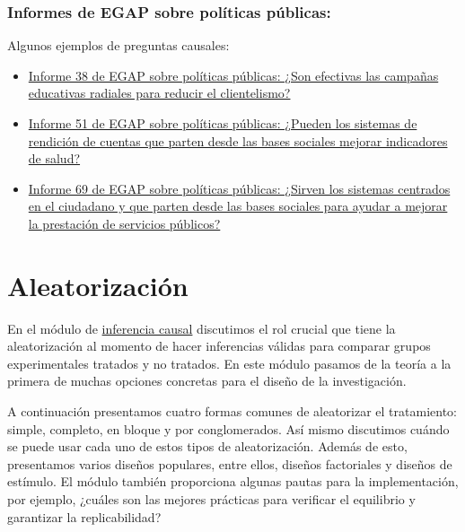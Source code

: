 \documentclass[
  12pt,
  spanish,
]{book}
\begin{document}
\hypertarget{informes-de-egap-sobre-poluxedticas-puxfablicas}{%
\subsection{Informes de EGAP sobre políticas públicas:}\label{informes-de-egap-sobre-poluxedticas-puxfablicas}}

Algunos ejemplos de preguntas causales:

\begin{itemize}
\item
  \href{https://egap.org/resource/brief-38-diminishing-the-effectiveness-of-vote-buying-through-voter-education/}{Informe 38 de EGAP sobre políticas públicas: ¿Son efectivas las campañas educativas radiales para reducir el clientelismo?}
\item
  \href{https://egap.org/resource/does-information-technology-improve-public-service-delivery-lessons-from-uganda/}{Informe 51 de EGAP sobre políticas públicas: ¿Pueden los sistemas de rendición de cuentas que parten desde las bases sociales mejorar indicadores de salud?}
\item
  \href{https://egap.org/resource/brief-69-bottom-up-accountability-and-public-service-provision-in-brazil/}{Informe 69 de EGAP sobre políticas públicas: ¿Sirven los sistemas centrados en el ciudadano y que parten desde las bases sociales para ayudar a mejorar la prestación de servicios públicos?}
\end{itemize}

\hypertarget{aleatorizaciuxf3n}{%
\chapter{Aleatorización}\label{aleatorizaciuxf3n}}

En el módulo de \href{inferencia-causal.html}{inferencia causal} discutimos el rol crucial que tiene la aleatorización al momento de hacer inferencias válidas para comparar grupos experimentales tratados y no tratados. En este módulo pasamos de la teoría a la primera de muchas opciones concretas para el diseño de la investigación.

A continuación presentamos cuatro formas comunes de aleatorizar el tratamiento: simple, completo, en bloque y por conglomerados. Así mismo discutimos cuándo se puede usar cada uno de estos tipos de aleatorización. Además de esto, presentamos varios diseños populares, entre ellos, diseños factoriales y diseños de estímulo. El módulo también proporciona algunas pautas para la implementación, por ejemplo, ¿cuáles son las mejores prácticas para verificar el equilibrio y garantizar la replicabilidad?
\end{document}
